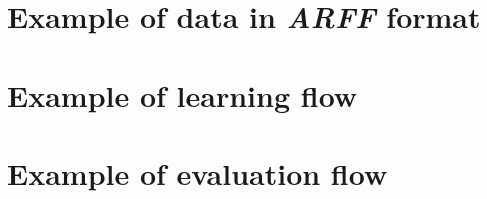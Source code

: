 \begin{appendices}
\newpage
\section{Example of data in \textit{ARFF} format}
\label{app:arff}



\newpage
\label{app:learning}
\section{Example of learning flow}


\newpage
\label{app:evaluating}
\section{Example of evaluation flow}


\end{appendices}
